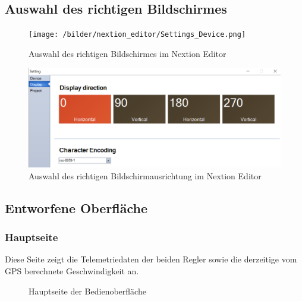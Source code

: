 \newpage
\subsection{Auswahl des richtigen Bildschirmes}
\begin{figure}[h]
    \centering
    \texttt{[image: /bilder/nextion\_editor/Settings\_Device.png]}
    \caption{Auswahl des richtigen Bildschirmes im Nextion Editor}
\end{figure}

\begin{figure}[h]
    \centering
    \includegraphics[width=\textwidth]{bilder/nextion_editor/Settings_Display.png}
    \caption{Auswahl des richtigen Bildschirmausrichtung im Nextion Editor}
\end{figure}

\newpage
\subsection{Entworfene Oberfläche}
\subsubsection{Hauptseite}
Diese Seite zeigt die Telemetriedaten der beiden Regler sowie die derzeitige vom GPS berechnete Geschwindigkeit an.
\begin{figure}[h]
    \centering
    \caption{Hauptseite der Bedienoberfläche}
\end{figure}
\newpage

